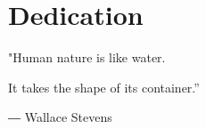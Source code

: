 \chapter{Dedication}

"Human nature is like water. 
                                                                                         
     It takes the shape of its container.” 
                                                                                         
                                                                                         ― Wallace Stevens
